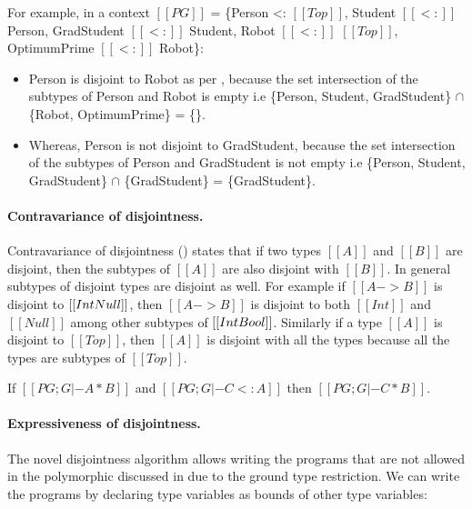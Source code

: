 
\noindent For example, in a context $[[PG]]$ = \{Person <: $[[Top]]$, 
Student $[[<:]]$ Person, GradStudent $[[<:]]$ Student, Robot $[[<:]]$ $[[Top]]$,
OptimumPrime $[[<:]]$ Robot\}:

\begin{itemize}
  \item Person is disjoint to Robot as per , 
        because the set intersection of the subtypes of
        Person and Robot is empty i.e \{Person, Student, GradStudent\} $\cap$
        \{Robot, OptimumPrime\} = \{\}.
  \item Whereas, Person is not disjoint to GradStudent, because the
  set intersection
        of the subtypes of Person and GradStudent is not empty i.e
        \{Person, Student, GradStudent\} $\cap$ \{GradStudent\}
        = \{GradStudent\}.
\end{itemize}


\paragraph{Contravariance of disjointness.}
Contravariance of disjointness ()
states that if two types $[[A]]$ and $[[B]]$ are disjoint, then the
subtypes of $[[A]]$ are also disjoint with $[[B]]$.
In general subtypes of disjoint types are disjoint as well.
For example if $[[A -> B]]$ is disjoint to $[[Int \/ Null]]$,
then $[[A -> B]]$ is disjoint to both $[[Int]]$ and $[[Null]]$
among other subtypes of $[[Int \/ Bool]]$.
Similarly if a type $[[A]]$ is disjoint to $[[Top]]$,
then $[[A]]$ is disjoint with all the types because all the types
are subtypes of $[[Top]]$. 

\begin{lemma}
  If $[[PG ; G |- A * B]]$ and $[[PG ; G |- C <: A]]$ then $[[PG ; G |- C * B]]$.
\label{lemma:union:disj:poly:contra}
\end{lemma}


\paragraph{Expressiveness of disjointness.}
The novel disjointness algorithm allows 
writing the programs that are not allowed
in the polymorphic \name discussed in 
 due to the ground type
restriction.
We can write the programs by
declaring type variables as bounds of other type variables:

